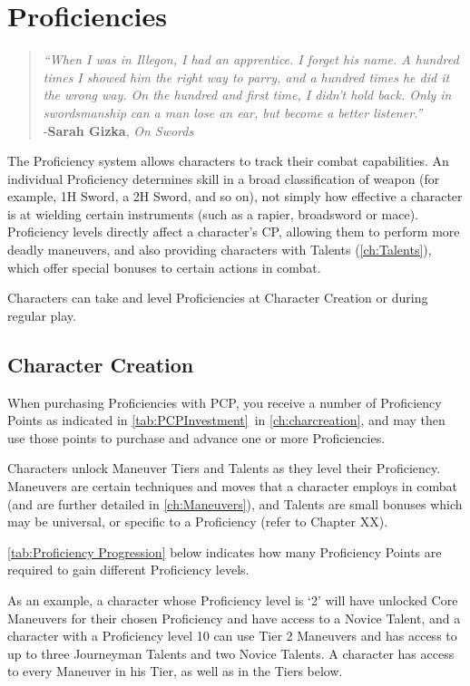 \documentclass[oneside,11pt,english]{book}
\begin{document}
\chapter{Proficiencies}\label{ch:proficiencies} 
\startcontents[chapters]
\clearpage
\begin{quote}
	\centering
	\emph{“When I was in Illegon, I had an apprentice. I forget his name. A hundred times I showed him the right way to parry, and a hundred times he did it the wrong way. On the hundred and first time, I didn’t hold back. Only in swordsmanship can a man lose an ear, but become a better listener.”}\\
	\hfill -\textbf{Sarah Gizka}, \textit{On Swords}
\end{quote}

The Proficiency system allows characters to track their combat capabilities. An individual Proficiency 
determines skill in a broad classification of weapon (for example, 1H Sword, a 2H Sword, and so on), not simply how effective a character is at wielding certain instruments (such as a rapier, broadsword or 
mace). Proficiency levels directly affect a character’s CP, allowing them to perform more deadly 
maneuvers, and also providing characters with Talents (\autoref{ch:Talents}), which offer special bonuses to certain actions in combat.

Characters can take and level Proficiencies at Character Creation or during regular play.

\section{Character Creation}
When purchasing Proficiencies with PCP, you receive a number of Proficiency Points as indicated in \autoref{tab:PCPInvestment}~in \autoref{ch:charcreation}, and may then use those points to purchase and advance one or more Proficiencies.

Characters unlock Maneuver Tiers and Talents as they level their Proficiency. Maneuvers are certain 
techniques and moves that a character employs in combat (and are further detailed in \autoref{ch:Maneuvers}), and 
Talents are small bonuses which may be universal, or specific to a Proficiency (refer to Chapter XX). 

\autoref{tab:Proficiency Progression} below indicates how many Proficiency Points are required to gain different Proficiency levels. 

As an example, a character whose Proficiency level is ‘2’ will have unlocked Core Maneuvers for their 
chosen Proficiency and have access to a Novice Talent, and a character with a Proficiency level 10 can 
use Tier 2 Maneuvers and has access to up to three Journeyman Talents and two Novice Talents. A 
character has access to every Maneuver in his Tier, as well as in the Tiers below. 
\end{document}
